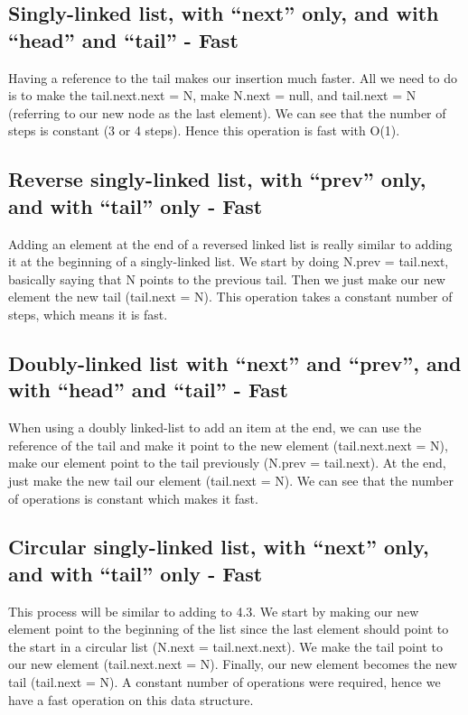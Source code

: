 \documentclass{article}
\begin{document}
\subsection{Singly-linked list, with “next” only, and with “head” and “tail” - Fast}
Having a reference to the tail makes our insertion much faster. All we need to do is to make the tail.next.next = N, make N.next = null, and tail.next = N (referring to our new node as the last element). We can see that the number of steps is constant (3 or 4 steps). Hence this operation is fast with O(1).

\subsection{Reverse singly-linked list, with “prev” only, and with “tail” only - Fast}
Adding an element at the end of a reversed linked list is really similar to adding it at the beginning of a singly-linked list. We start by doing N.prev = tail.next, basically saying that N points to the previous tail. Then we just make our new element the new tail (tail.next = N). This operation takes a constant number of steps, which means it is fast.

\subsection{Doubly-linked list with “next” and “prev”, and with “head” and “tail” - Fast}
When using a doubly linked-list to add an item at the end, we can use the reference of the tail and make it point to the new element (tail.next.next = N), make our element point to the tail previously (N.prev = tail.next). At the end, just make the new tail our element (tail.next = N). We can see that the number of operations is constant which makes it fast.

\subsection{Circular singly-linked list, with “next” only, and with “tail” only - Fast}
This process will be similar to adding to 4.3. We start by making our new element point to the beginning of the list since the last element should point to the start in a circular list (N.next = tail.next.next). We make the tail point to our new element (tail.next.next = N). Finally, our new element becomes the new tail (tail.next = N). A constant number of operations were required, hence we have a fast operation on this data structure.
\end{document}
